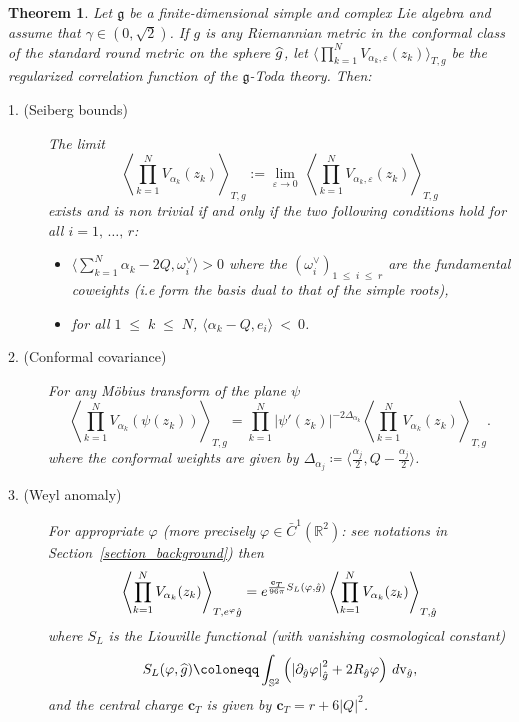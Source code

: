 \documentclass[10pt]{amsart}
\newtheorem{theo}{Theorem}[section]
\theoremstyle{definition}\newtheorem{defi}[theo]{Definition}\newtheorem{rema}[theo]{Remark}\newtheorem{exam}[theo]{Example}\newtheorem{exem}[theo]{Example}\newtheorem{nota}[theo]{Notation}
\renewcommand{\leq}{\;\leqslant\;}
\newcommand{\frkg}{\mathfrak{g}}
\newcommand{\rmv}{\mathrm{v}}
\newcommand{\R}{\mathbb{R}}
\renewcommand*\S{\mathbb{S}}
\newcommand{\bfc}{\mathbf{c}}
\newcommand{\ps}[1]{\langle #1 \rangle}
\newcommand*\eps{\varepsilon}
\let\oldhat\hat
\renewcommand*{\hat}[1]{\mathchoice{\widehat{#1}}{\widehat{#1}}{\oldhat{#1}}{\oldhat{#1}}}
\begin{document}
\begin{theo}\label{construction}
Let $\frkg$ be a finite-dimensional simple and complex Lie algebra and assume that $\gamma\in(0,\sqrt 2)$. If $g$ is any Riemannian metric in the conformal class of the standard round metric on the sphere $\hat g$, let $\langle \prod_{k=1}^NV_{\alpha_k,\eps}(z_k)\rangle_{T,g} $ be the regularized correlation function of the $\frkg$-Toda theory. Then:
\begin{description}
\item[1. (Seiberg bounds)] The limit
\begin{equation*}
\left\langle \prod_{k=1}^NV_{\alpha_k}(z_k)\right\rangle_{T,g}:= \underset{\eps \to 0}{\lim} \: \left\langle \prod_{k=1}^NV_{\alpha_k,\eps}(z_k)\right\rangle_{T,g}
\end{equation*}
exists and is non trivial if and only if the two following conditions hold for all ${i=1,\,\dots,\,r}$:
\begin{itemize}
\item $\ps{\sum_{k=1}^N\alpha_k-2Q,\omega_i^\vee} >0$ where the $(\omega_i^\vee)_{1\leq i\leq r}$ are the fundamental cowei\-ghts (i.e form the basis dual to that of the simple roots),
\item for all $1\leq k\leq N$, $ \langle\alpha_k-Q, e_i \rangle \: < \: 0$.
\end{itemize}
\item[2. (Conformal covariance)] For any M\"obius transform of the plane $\psi$
\begin{equation*}
\left\langle \prod_{k=1}^NV_{\alpha_k}(\psi (z_k))\right\rangle_{T,g}= \prod_{k=1}^N\left|\psi'(z_k)\right|^{-2\Delta_{\alpha_k}}\left\langle \prod_{k=1}^NV_{\alpha_k}(z_k) \right\rangle_{T,g}.
\end{equation*}
where the conformal weights are given by $\Delta_{\alpha_j}\coloneqq \ps{ \frac{\alpha_j}2, Q-\frac{\alpha_j}{2}}$.
\item[3. (Weyl anomaly)] For appropriate $\varphi$ (more precisely $\varphi\in\bar{C}^1(\R^2)$: see notations in Section~\ref{section_background}) then
\begin{equation*}
\left\langle \prod_{k=1}^NV_{\alpha_k}(z_k)\right\rangle_{T,e^\varphi \hat g} =e^{ \frac{\bfc_T}{96 \pi}S_L(\varphi,\hat g) } \left\langle \prod_{k=1}^NV_{\alpha_k}(z_k)\right\rangle_{T,\hat{g}}
\end{equation*}
where $S_L$ is the Liouville functional (with vanishing cosmological constant)
\[
S_L(\varphi,\hat g)\coloneqq \int_{\S^2 }\left(\left|\partial_{\hat{g}} \varphi\right|^2_{\hat{g}} + 2 R_{\hat{g}} \varphi \right) \,d\rmv_{\hat{g}},
\]
and the central charge $\bfc_T$ is given by $\bfc_T= r+ 6 |Q|^2 $.
\end{description}
\end{theo}
\end{document}
